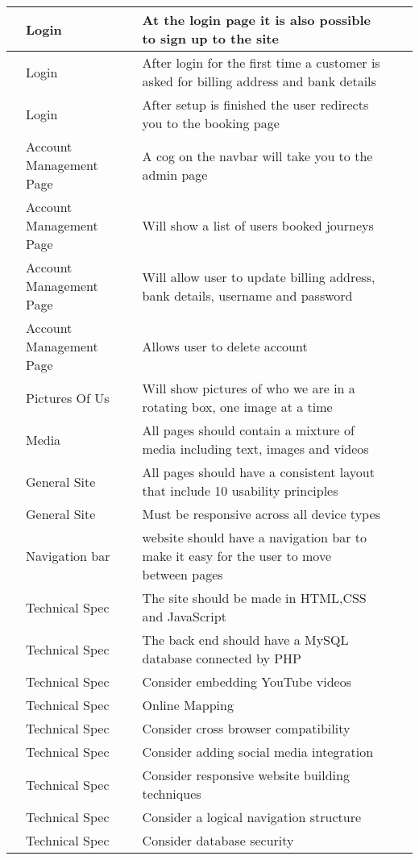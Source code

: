 \documentclass{article}
\newcounter{rowcount}
\begin{document}
\begin{tabular} {>{\stepcounter{rowcount}\therowcount}p{0.5cm}@{}*{2}{p{3cm}|p{12cm}}}
    \hline
    & Login & At the login page it is also possible to sign up to the site \\
    \hline
    & Login & After login for the first time a customer is asked for billing address and bank details \\
    \hline
    & Login & After setup is finished the user redirects you to the booking page \\
    \hline
    & Account Management Page & A cog on the navbar will take you to the admin page \\
    \hline
    & Account Management Page & Will show a list of users booked journeys \\
    \hline
    & Account Management Page & Will allow user to update billing address, bank details, username and password \\
    \hline
    & Account Management Page & Allows user to delete account \\
    \hline
    & Pictures Of Us & Will show pictures of who we are in a rotating box, one image at a time\\
    \hline
    & Media & All pages should contain a mixture of media including text, images and videos \\
    \hline
    & General Site & All pages should have a consistent layout that include 10 usability principles  \\
    \hline
    & General Site & Must be responsive across all device types \\
    \hline
    & Navigation bar & website should have a navigation bar to make it easy for the user to move between pages \\
    \hline
    & Technical Spec & The site should be made in HTML,CSS and JavaScript \\
    \hline 
    & Technical Spec & The back end should have a MySQL database connected by PHP\\
    \hline
    & Technical Spec & Consider embedding YouTube videos \\
    \hline
    & Technical Spec & Online Mapping\\
    \hline
    & Technical Spec & Consider cross browser compatibility  \\
    \hline
    & Technical Spec & Consider adding social media integration \\
    \hline
    & Technical Spec & Consider responsive website building techniques\\
    \hline
    & Technical Spec & Consider a logical navigation structure \\
    \hline
    & Technical Spec & Consider database security \\
    \hline
    \end{tabular}
\end{document}
